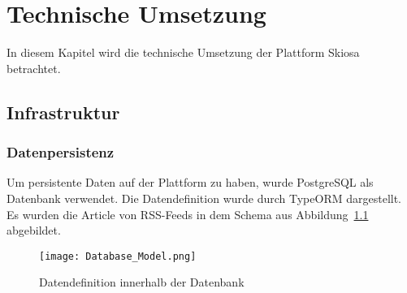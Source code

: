
\chapter{Technische Umsetzung}
In diesem Kapitel wird die technische Umsetzung der Plattform Skiosa betrachtet.

\section{Infrastruktur}
\todo{}

\subsection{Datenpersistenz}
Um persistente Daten auf der Plattform zu haben, wurde PostgreSQL \parencite{web/postgresql} als Datenbank verwendet.
Die Datendefinition wurde durch TypeORM \parencite{web/TypeORM} dargestellt.
Es wurden die Article von RSS-Feeds in dem Schema aus Abbildung~\ref{fig:databaseORM} abgebildet.
\begin{figure}
    \texttt{[image: Database\_Model.png]}
    \caption{Datendefinition innerhalb der Datenbank}
    \label{fig:databaseORM}
\end{figure}